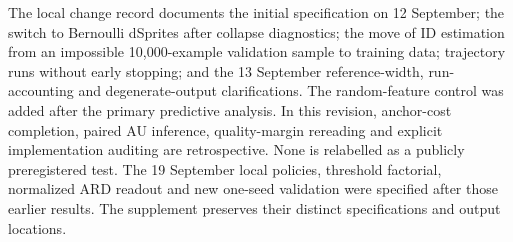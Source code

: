 \documentclass[make,article,submit,pdftex,moreauthors]{Definitions/mdpi}
\begin{document}
The local change record documents the initial specification on
12 September; the switch to Bernoulli dSprites after collapse diagnostics;
the move of ID estimation from an impossible 10,000-example validation
sample to training data; trajectory runs without early stopping; and
the 13 September reference-width, run-accounting and degenerate-output
clarifications. The random-feature control was added after the primary
predictive analysis. In this revision, anchor-cost completion, paired AU
inference, quality-margin rereading and explicit implementation auditing
are retrospective. None is relabelled as a publicly preregistered test.
The 19 September local policies, threshold factorial, normalized ARD
readout and new one-seed validation were specified after those earlier
results. The supplement preserves their distinct specifications and
output locations.
\end{document}
